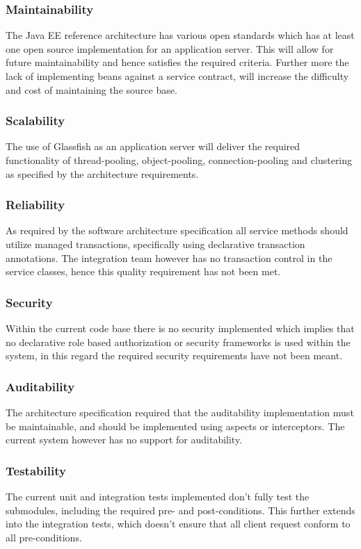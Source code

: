 \documentclass[a4paper,10pt]{article}
\begin{document}
\subsubsection{Maintainability}
The Java EE reference architecture has various open standards which has at least one open source implementation for an application server. This will allow for future maintainability and hence satisfies the required criteria.  Further more the lack of implementing beans against a service contract, will increase the difficulty and cost of maintaining the source base.

\subsubsection{Scalability}
The use of Glassfish as an application server will deliver the required functionality of thread-pooling, object-pooling, connection-pooling and clustering as specified by the architecture requirements.

\subsubsection{Reliability}
As required by the software architecture specification all service methods should utilize managed transactions, specifically using declarative transaction annotations. The integration team however has no transaction control in the service classes, hence this quality requirement has not been met.

\subsubsection{Security}
Within the current code base there is no security implemented which implies that no declarative role based authorization or security frameworks is used within the system, in this regard the required security requirements have not been meant.

\subsubsection{Auditability}
The architecture specification required that the auditability implementation must be maintainable, and should be implemented using aspects or interceptors. The current system however has no support for auditability.

\subsubsection{Testability}
The current unit and integration tests implemented don't fully test the submodules, including the required pre- and post-conditions.  This further extends into the integration tests, which doesn't ensure that all client request conform to all pre-conditions.
\end{document}
